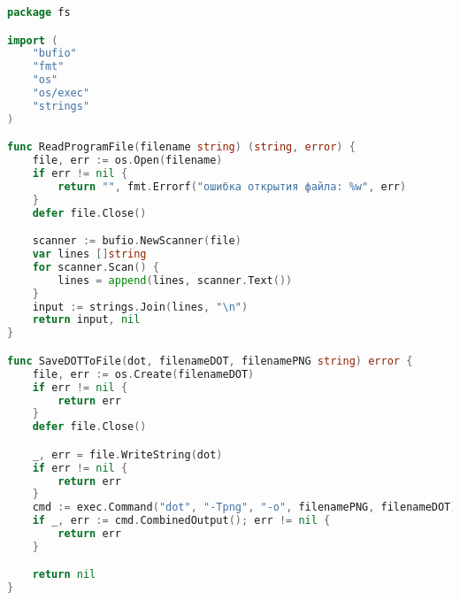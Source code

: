 \begin{lstlisting}[language=Go, caption={Код модуля \textit{fs}}, label=lst2]
package fs

import (
	"bufio"
	"fmt"
	"os"
	"os/exec"
	"strings"
)

func ReadProgramFile(filename string) (string, error) {
	file, err := os.Open(filename)
	if err != nil {
		return "", fmt.Errorf("ошибка открытия файла: %w", err)
	}
	defer file.Close()

	scanner := bufio.NewScanner(file)
	var lines []string
	for scanner.Scan() {
		lines = append(lines, scanner.Text())
	}
	input := strings.Join(lines, "\n")
	return input, nil
}

func SaveDOTToFile(dot, filenameDOT, filenamePNG string) error {
	file, err := os.Create(filenameDOT)
	if err != nil {
		return err
	}
	defer file.Close()

	_, err = file.WriteString(dot)
	if err != nil {
		return err
	}
	cmd := exec.Command("dot", "-Tpng", "-o", filenamePNG, filenameDOT)
	if _, err := cmd.CombinedOutput(); err != nil {
		return err
	}

	return nil
}

\end{lstlisting}


\newpage